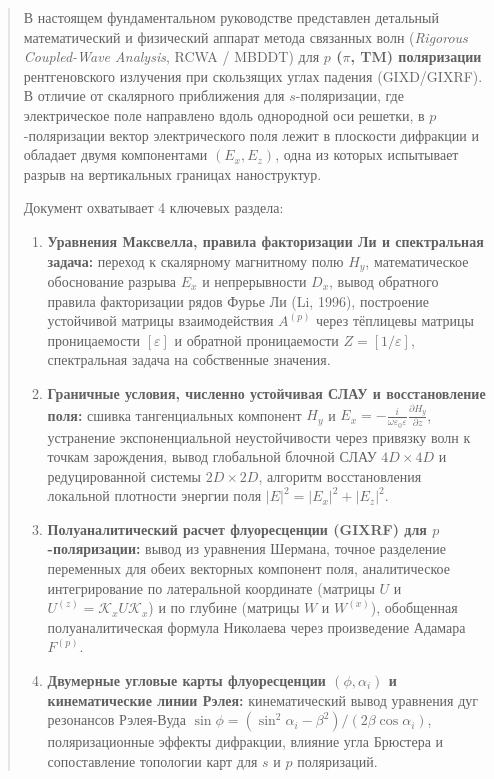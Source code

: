 \documentclass[a4paper,11pt]{article}
\begin{document}
\begin{abstract}
В настоящем фундаментальном руководстве представлен детальный математический и физический аппарат метода связанных волн (\textit{Rigorous Coupled-Wave Analysis}, RCWA / MBDDT) для \textbf{$p$ ($\pi$, TM) поляризации} рентгеновского излучения при скользящих углах падения (GIXD/GIXRF). В отличие от скалярного приближения для $s$-поляризации, где электрическое поле направлено вдоль однородной оси решетки, в $p$-поляризации вектор электрического поля лежит в плоскости дифракции и обладает двумя компонентами $(E_x, E_z)$, одна из которых испытывает разрыв на вертикальных границах наноструктур.

Документ охватывает 4 ключевых раздела:
\begin{enumerate}
    \item \textbf{Уравнения Максвелла, правила факторизации Ли и спектральная задача:} переход к скалярному магнитному полю $H_y$, математическое обоснование разрыва $E_x$ и непрерывности $D_x$, вывод обратного правила факторизации рядов Фурье Ли (Li, 1996), построение устойчивой матрицы взаимодействия $A^{(p)}$ через тёплицевы матрицы проницаемости $[\varepsilon]$ и обратной проницаемости $Z = [1/\varepsilon]$, спектральная задача на собственные значения.
    \item \textbf{Граничные условия, численно устойчивая СЛАУ и восстановление поля:} сшивка тангенциальных компонент $H_y$ и $E_x = -\frac{i}{\omega\varepsilon_0\varepsilon} \frac{\partial H_y}{\partial z}$, устранение экспоненциальной неустойчивости через привязку волн к точкам зарождения, вывод глобальной блочной СЛАУ $4D \times 4D$ и редуцированной системы $2D \times 2D$, алгоритм восстановления локальной плотности энергии поля $|E|^2 = |E_x|^2 + |E_z|^2$.
    \item \textbf{Полуаналитический расчет флуоресценции (GIXRF) для $p$-поляризации:} вывод из уравнения Шермана, точное разделение переменных для обеих векторных компонент поля, аналитическое интегрирование по латеральной координате (матрицы $U$ и $U^{(z)} = \mathcal{K}_x U \mathcal{K}_x$) и по глубине (матрицы $W$ и $W^{(x)}$), обобщенная полуаналитическая формула Николаева через произведение Адамара $F^{(p)}$.
    \item \textbf{Двумерные угловые карты флуоресценции $(\phi, \alpha_i)$ и кинематические линии Рэлея:} кинематический вывод уравнения дуг резонансов Рэлея-Вуда $\sin\phi = (\sin^2\alpha_i - \beta^2) / (2\beta\cos\alpha_i)$, поляризационные эффекты дифракции, влияние угла Брюстера и сопоставление топологии карт для $s$ и $p$ поляризаций.
\end{enumerate}
\end{abstract}
\end{document}
